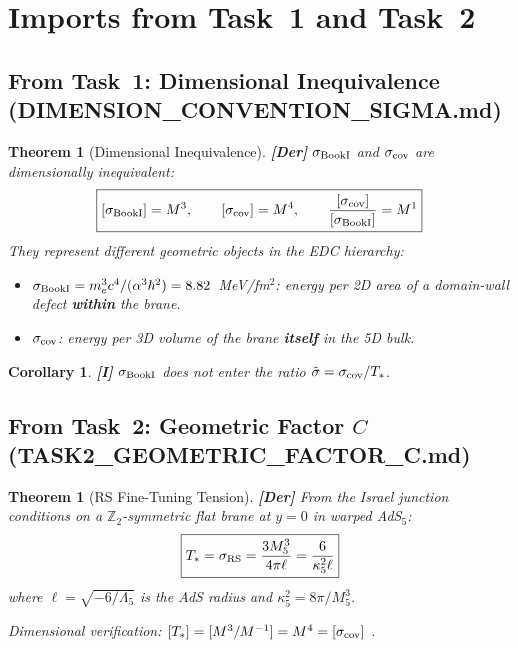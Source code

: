 \documentclass[11pt,a4paper]{article}
\newcommand{\tagDer}{\textcolor{derivedblue}{\textbf{[Der]}}}
\newcommand{\tagI}{\textcolor{mathpurple}{\textbf{[I]}}}
\newtheorem{theorem}[proposition]{Theorem}
\newtheorem{corollary}[proposition]{Corollary}
\theoremstyle{definition}
\theoremstyle{remark}
\begin{document}
\section{Imports from Task~1 and Task~2}
\label{sec:imports}

\subsection{From Task~1: Dimensional Inequivalence (DIMENSION\_CONVENTION\_SIGMA.md)}

\begin{theorem}[Dimensional Inequivalence] \tagDer
$\sigma_{\rm BookI}$ and $\sigma_{\rm cov}$ are dimensionally inequivalent:
\begin{equation}
\boxed{
[\sigma_{\rm BookI}] = M^3, \qquad [\sigma_{\rm cov}] = M^4, \qquad
\frac{[\sigma_{\rm cov}]}{[\sigma_{\rm BookI}]} = M^1
}
\end{equation}
They represent different geometric objects in the EDC hierarchy:
\begin{itemize}
\item $\sigma_{\rm BookI} = m_e^3 c^4/(\alpha^3\hbar^2) = 8.82$~MeV/fm$^2$:
  energy per 2D area of a domain-wall defect \textbf{within} the brane.
\item $\sigma_{\rm cov}$: energy per 3D volume of the brane \textbf{itself}
  in the 5D bulk.
\end{itemize}
\end{theorem}

\begin{corollary} \tagI
$\sigma_{\rm BookI}$ does not enter the ratio
$\tilde\sigma = \sigma_{\rm cov}/T_*$.
\end{corollary}

\subsection{From Task~2: Geometric Factor $C$ (TASK2\_GEOMETRIC\_FACTOR\_C.md)}

\begin{theorem}[RS Fine-Tuning Tension] \tagDer
\label{thm:tstar}
From the Israel junction conditions on a $\mathbb{Z}_2$-symmetric
flat brane at $y = 0$ in warped AdS$_5$:
\begin{equation}
\boxed{
T_* = \sigma_{\rm RS} = \frac{3M_5^3}{4\pi\ell}
= \frac{6}{\kappa_5^2\ell}
}
\label{eq:tstar}
\end{equation}
where $\ell = \sqrt{-6/\Lambda_5}$ is the AdS radius and
$\kappa_5^2 = 8\pi/M_5^3$.

Dimensional verification: $[T_*] = [M^3/M^{-1}] = M^4 = [\sigma_{\rm cov}]$ \checkmark.
\end{theorem}
\end{document}
